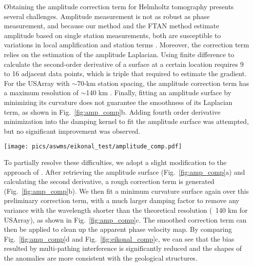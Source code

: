 Obtaining the amplitude correction term for Helmholtz tomography presents several challenges. Amplitude measurement is not as robust as phase measurement, and because our method and the FTAN method estimate amplitude based on single station measurements, both are susceptible to variations in local amplification and station terms \citep{Lin:2012bc,Eddy:2014io}. Moreover, the correction term relies on the estimation of the amplitude Laplacian. Using finite difference to calculate the second-order derivative of a surface at a certain location requires 9 to 16 adjacent data points, which is triple that required to estimate the gradient. For the USArray with $\sim$70-km station spacing, the amplitude correction term has a maximum resolution of $\sim$140 km \citep{Lin:2011fw}. Finally, fitting an amplitude surface by minimizing its curvature does not guarantee the smoothness of its Laplacian term, as shown in Fig.~\ref{fig:amp_comp}b. Adding fourth order derivative minimization into the damping kernel to fit the amplitude surface was attempted, but no significant improvement was observed.

\begin{figure*}
	\texttt{[image: pics/aswms/eikonal\_test/amplitude\_comp.pdf]}
	\caption[Demonstration of the amplitude-correction procedure.]{Demonstration of the amplitude-correction procedure on the apparent phase-velocity map in Fig.~\ref{fig:eikonal_comp}c. \textbf{a)} The amplitude map generated from the minimum-curvature surface interpolation. \textbf{b)} The preliminary correction term derived from a) via Helmholtz equation. \textbf{c)} The smoothed correction term. \textbf{d)} The corrected phase velocity map, derived from c) and Fig.~\ref{fig:eikonal_comp}c. }
	\label{fig:amp_comp}
\end{figure*}

To partially resolve these difficulties, we adopt a slight modification to the approach of \citet{Lin:2011fw}. After retrieving the amplitude surface (Fig.~\ref{fig:amp_comp}a) and calculating the second derivative, a rough correction term is generated (Fig.~\ref{fig:amp_comp}b). We then fit a minimum curvature surface again over this preliminary correction term, with a much larger damping factor to remove any variance with the wavelength shorter than the theoretical resolution (~140 km for USArray), as shown in Fig.~\ref{fig:amp_comp}c. The smoothed correction term can then be applied to clean up the apparent phase velocity map. By comparing Fig.~\ref{fig:amp_comp}d and Fig.~\ref{fig:eikonal_comp}c, we can see that the bias resulted by multi-pathing interference is significantly reduced and the shapes of the anomalies are more consistent with the geological structures. 

